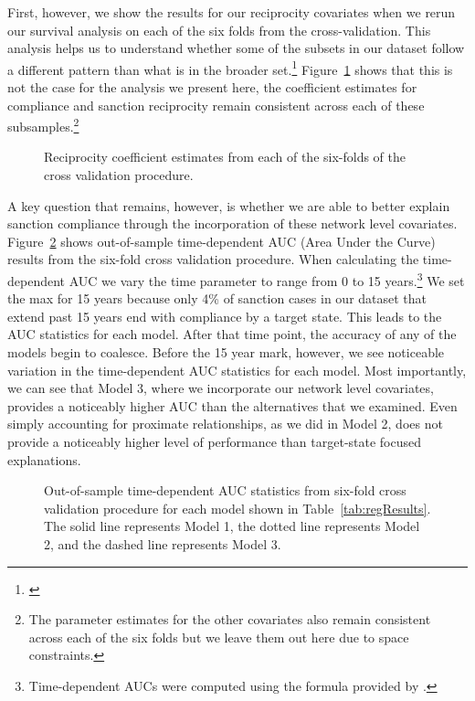 First, however, we show the results for our reciprocity covariates when we rerun our survival analysis on each of the six folds from the cross-validation. This analysis helps us to understand whether some of the subsets in our dataset follow a different pattern than what is in the broader set.\footnote{\cite{beck2008time}} Figure~\ref{fig:crossval} shows that this is not the case for the analysis we present here, the coefficient estimates for compliance and sanction reciprocity remain consistent across each of these subsamples.\footnote{The parameter estimates for the other covariates also remain consistent across each of the six folds but we leave them out here due to space constraints.}


\begin{figure}[ht]
	\centering
	\caption{Reciprocity coefficient estimates from each of the six-folds of the cross validation procedure.}
	\resizebox{1\textwidth}{!}{}
	\label{fig:crossval}
\end{figure}


A key question that remains, however, is whether we are able to better explain sanction compliance through the incorporation of these network level covariates. Figure~\ref{fig:auc} shows out-of-sample time-dependent AUC (Area Under the Curve) results from the six-fold cross validation procedure. When calculating the time-dependent AUC we vary the time parameter to range from 0 to 15 years.\footnote{Time-dependent AUCs were computed using the formula provided by \citet{chambless2006estimation}.} We set the max for 15 years because only 4\% of sanction cases in our dataset that extend past 15 years end with compliance by a target state. This leads to the AUC statistics for each model. After that time point, the accuracy of any of the models begin to coalesce. Before the 15 year mark, however, we see noticeable variation in the time-dependent AUC statistics for each model. Most importantly, we can see that Model 3, where we incorporate our network level covariates, provides a noticeably higher AUC than the alternatives that we examined. Even simply accounting for proximate relationships, as we did in Model 2, does not provide a noticeably higher level of performance than target-state focused explanations.

\begin{figure}[ht]
	\centering
	\caption{Out-of-sample time-dependent AUC statistics from six-fold cross validation procedure for each model shown in Table~\ref{tab:regResults}. The solid line represents Model 1, the dotted line represents Model 2, and the dashed line represents Model 3.}
	\resizebox{1\textwidth}{!}{}
	\label{fig:auc}
\end{figure}